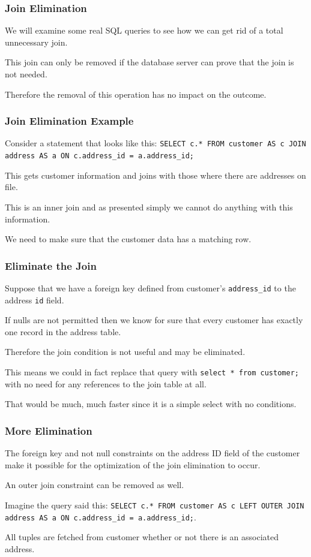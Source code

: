 \begin{frame}
\frametitle{Join Elimination}

We will examine some real SQL queries to see how we can get rid of a total unnecessary join.

This join can only be removed if the database server can prove that the join is not needed.

Therefore the removal of this operation has no impact on the outcome.


\end{frame}

\begin{frame}
\frametitle{Join Elimination Example}

Consider a statement that looks like this: \texttt{SELECT c.* FROM customer AS c JOIN address AS a ON c.address\_id = a.address\_id;} 

This gets customer information and joins with those where there are addresses on file. 

This is an inner join and as presented simply we cannot do anything with this information. 

We need to make sure that the customer data has a matching row.


\end{frame}

\begin{frame}
\frametitle{Eliminate the Join}

Suppose that we have a foreign key defined from customer's \texttt{address\_id} to the address \texttt{id} field. 

If nulls are not permitted then we know for sure that every customer has exactly one record in the address table.

Therefore the join condition is not useful and may be eliminated. 

This means we could in fact replace that query with \texttt{select * from customer;} with no need for any references to the join table at all. 

That would be much, much faster since it is a simple select with no conditions.


\end{frame}

\begin{frame}
\frametitle{More Elimination}

The foreign key and not null constraints on the address ID field of the customer make it possible for the optimization of the join elimination to occur.

An outer join constraint can be removed as well.

Imagine the query said this: \texttt{SELECT c.* FROM customer AS c LEFT OUTER JOIN address AS a ON c.address\_id = a.address\_id;}. 

All tuples are fetched from customer whether or not there is an associated address. 

\end{frame}

